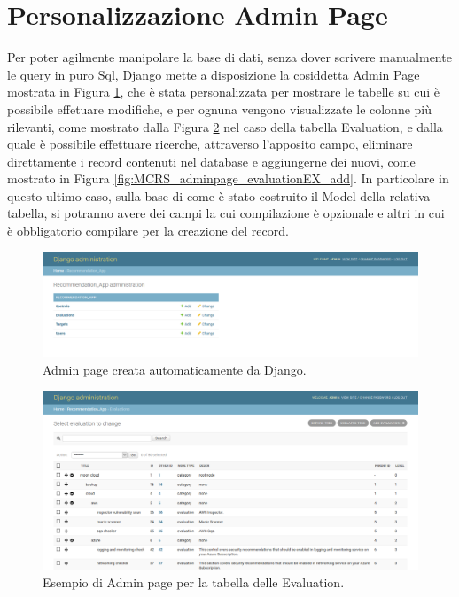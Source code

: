 \section*{Personalizzazione Admin Page}
Per poter agilmente manipolare la base di dati, senza dover scrivere manualmente le query in puro Sql, Django mette a disposizione 
la cosiddetta Admin Page mostrata in Figura \ref{fig:MCRS_adminpage}, che è stata personalizzata per mostrare le tabelle su cui è possibile 
effetuare modifiche, e per ognuna vengono visualizzate le colonne più rilevanti, come mostrato dalla 
Figura \ref{fig:MCRS_adminpage_evaluationEX} nel caso della tabella Evaluation, e dalla quale è possibile effettuare ricerche, attraverso 
l'apposito campo, eliminare direttamente i record contenuti nel database e aggiungerne dei nuovi, come mostrato in 
Figura \ref{fig:MCRS_adminpage_evaluationEX_add}.\hfill\break
In particolare in questo ultimo caso, sulla base di come è stato costruito il Model della relativa tabella, si potranno avere dei campi 
la cui compilazione è opzionale e altri in cui è obbligatorio compilare per la creazione del record.
%
\begin{figure}[ht!]
    \includegraphics[scale=0.3]{images/MCRS_adminpage.png}
    \caption{Admin page creata automaticamente da Django.}
    \label{fig:MCRS_adminpage}
\end{figure}
%
\begin{figure}[ht!]
    \includegraphics[scale=0.3]{images/MCRS_adminpage_evaluationEX.png}
    \caption{Esempio di Admin page per la tabella delle Evaluation.}
    \label{fig:MCRS_adminpage_evaluationEX}
\end{figure}
